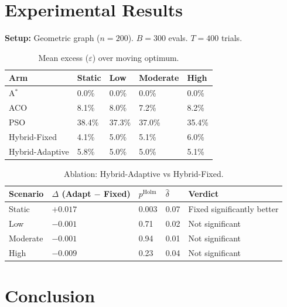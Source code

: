 \documentclass[11pt,a4paper]{article}
\theoremstyle{definition}
\newcommand{\excess}{\varepsilon}
\begin{document}
\section{Experimental Results}
\label{sec:results}

\textbf{Setup:} Geometric graph ($n=200$). $B=300$ evals. $T=400$ trials.

\begin{table}[h]\centering
  \caption{Mean excess ($\excess$) over moving optimum.}
  \begin{tabular}{lllll}
    \toprule Arm & Static & Low & Moderate & High \\ \midrule
    A$^*$ & 0.0\% & 0.0\% & 0.0\% & 0.0\% \\
    ACO & 8.1\% & 8.0\% & 7.2\% & 8.2\% \\
    PSO & 38.4\% & 37.3\% & 37.0\% & 35.4\% \\
    Hybrid-Fixed & 4.1\% & 5.0\% & 5.1\% & 6.0\% \\
    Hybrid-Adaptive & 5.8\% & 5.0\% & 5.0\% & 5.1\% \\ \bottomrule
  \end{tabular}
\end{table}

\begin{table}[h]\centering
  \caption{Ablation: Hybrid-Adaptive vs Hybrid-Fixed.}
  \begin{tabular}{lllll}
    \toprule Scenario & $\Delta$ (Adapt $-$ Fixed) & $p^{\mathrm{Holm}}$ & $\hat\delta$ & Verdict \\ \midrule
    Static   & $+0.017$ & 0.003 & 0.07 & Fixed significantly better \\
    Low      & $-0.001$ & 0.71 & 0.02 & Not significant \\
    Moderate & $-0.001$ & 0.94 & 0.01 & Not significant \\
    High     & $-0.009$ & 0.23 & 0.04 & Not significant \\ \bottomrule
  \end{tabular}
\end{table}

\section{Conclusion}
\label{sec:conclusion}
\end{document}
